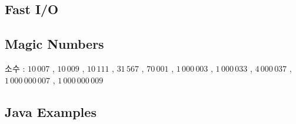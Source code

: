 \documentclass[10pt,landscape,a4paper,twocolumn]{article}
\begin{document}
\subsection{Fast I/O}


\subsection{Magic Numbers}

소수 : $10\,007$ , $10\,009$ , $10\,111$ , $31\,567$ , $70\,001$ , $1\,000\,003$ , $1\,000\,033$ , $4\,000\,037$ , $1\,000\,000\,007$ , $1\,000\,000\,009$

\subsection{Java Examples}

\end{document}
